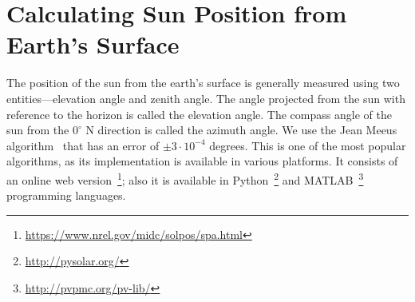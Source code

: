 
\chapter{Calculating Sun Position from Earth's Surface} %
\label{append:sunposition} %


The position of the sun from the earth's surface is generally measured using two entities---elevation angle and zenith angle. The angle projected from the sun with reference to the horizon is called the elevation angle. The compass angle of the sun from the $0^{\circ}$ N direction is called the azimuth angle. We use the Jean Meeus algorithm~\cite{SPA} that has an error of $\pm 3\cdot 10^{-4}$ degrees. This is one of the most popular algorithms, as its implementation is available in various platforms. It consists of an online web version~\footnote{\url{https://www.nrel.gov/midc/solpos/spa.html}}; also it is available in Python~\footnote{\url{http://pysolar.org/}} and MATLAB~\footnote{\url{http://pvpmc.org/pv-lib/}} programming languages. 




